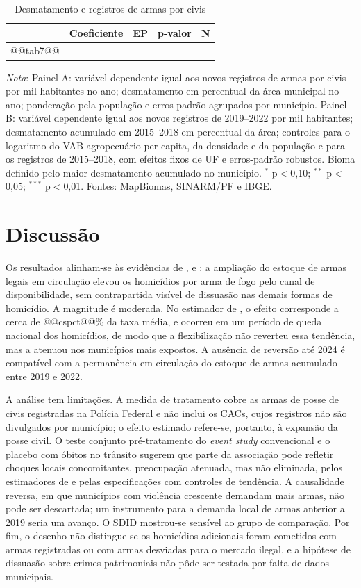 \documentclass[11pt,a4paper]{article}
\newcommand{\nota}[1]{\par\vspace{2pt}\begin{minipage}{\linewidth}\footnotesize\textit{Nota}: #1\end{minipage}}
\begin{document}
\begin{table}[H]
\centering\footnotesize\setlength{\tabcolsep}{4pt}
\caption{Desmatamento e registros de armas por civis}\label{tab:desm}
\begin{tabular}{lcccc}
\toprule
 & Coeficiente & EP & p-valor & N \\
\midrule
@@tab7@@
\bottomrule
\end{tabular}
\nota{Painel A: variável dependente igual aos novos registros de armas por civis por mil habitantes no ano; desmatamento em percentual da área municipal no ano; ponderação pela população e erros-padrão agrupados por município. Painel B: variável dependente igual aos novos registros de 2019--2022 por mil habitantes; desmatamento acumulado em 2015--2018 em percentual da área; controles para o logaritmo do VAB agropecuário per capita, da densidade e da população e para os registros de 2015--2018, com efeitos fixos de UF e erros-padrão robustos. Bioma definido pelo maior desmatamento acumulado no município. $^{*}$ p$<$0,10; $^{**}$ p$<$0,05; $^{***}$ p$<$0,01. Fontes: MapBiomas, SINARM/PF e IBGE.}
\end{table}

\section{Discussão}\label{sec:discussao}

Os resultados alinham-se às evidências de \citet{duggan2001}, \citet{cook2006} e \citet{cerqueira2012}: a ampliação do estoque de armas legais em circulação elevou os homicídios por arma de fogo pelo canal de disponibilidade, sem contrapartida visível de dissuasão nas demais formas de homicídio. A magnitude é moderada. No estimador de \citet{callaway2021}, o efeito corresponde a cerca de @@cspct@@\% da taxa média, e ocorreu em um período de queda nacional dos homicídios, de modo que a flexibilização não reverteu essa tendência, mas a atenuou nos municípios mais expostos. A ausência de reversão até 2024 é compatível com a permanência em circulação do estoque de armas acumulado entre 2019 e 2022.

A análise tem limitações. A medida de tratamento cobre as armas de posse de civis registradas na Polícia Federal e não inclui os CACs, cujos registros não são divulgados por município; o efeito estimado refere-se, portanto, à expansão da posse civil. O teste conjunto pré-tratamento do \textit{event study} convencional e o placebo com óbitos no trânsito sugerem que parte da associação pode refletir choques locais concomitantes, preocupação atenuada, mas não eliminada, pelos estimadores de \citet{callaway2021} e pelas especificações com controles de tendência. A causalidade reversa, em que municípios com violência crescente demandam mais armas, não pode ser descartada; um instrumento para a demanda local de armas anterior a 2019 seria um avanço. O SDID mostrou-se sensível ao grupo de comparação. Por fim, o desenho não distingue se os homicídios adicionais foram cometidos com armas registradas ou com armas desviadas para o mercado ilegal, e a hipótese de dissuasão sobre crimes patrimoniais não pôde ser testada por falta de dados municipais.
\end{document}
